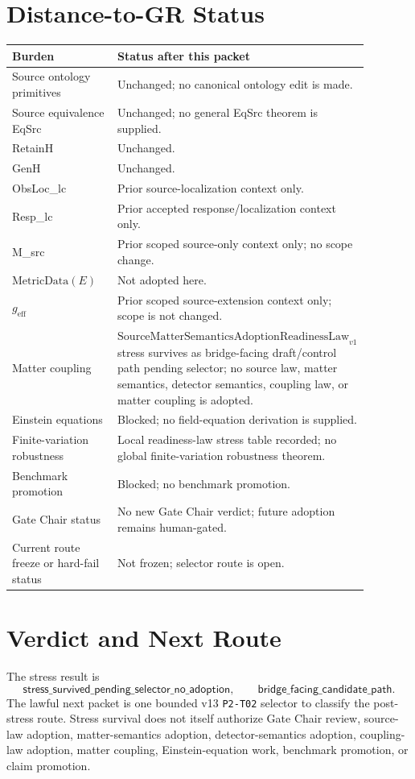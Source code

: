 \documentclass[11pt]{article}
\newcommand{\SMSAR}{\mathrm{SourceMatterSemanticsAdoptionReadinessLaw}_{v1}}
\newcommand{\MetricData}{\mathrm{MetricData}}
\newcommand{\geff}{g_{\mathrm{eff}}}
\newcommand{\StressVerdict}{\mathsf{stress\_survived\_pending\_selector\_no\_adoption}}
\begin{document}
\section{Distance-to-GR Status}

\begin{longtable}{p{0.30\linewidth}p{0.58\linewidth}}
\toprule
Burden & Status after this packet \\
\midrule
Source ontology primitives & Unchanged; no canonical ontology edit is made. \\
Source equivalence EqSrc & Unchanged; no general EqSrc theorem is supplied. \\
RetainH & Unchanged. \\
GenH & Unchanged. \\
ObsLoc\_lc & Prior source-localization context only. \\
Resp\_lc & Prior accepted response/localization context only. \\
M\_src & Prior scoped source-only context only; no scope change. \\
\(\MetricData(E)\) & Not adopted here. \\
\(\geff\) & Prior scoped source-extension context only; scope is not changed. \\
Matter coupling & \(\SMSAR\) stress survives as bridge-facing draft/control
path pending selector; no source law, matter semantics, detector semantics,
coupling law, or matter coupling is adopted. \\
Einstein equations & Blocked; no field-equation derivation is supplied. \\
Finite-variation robustness & Local readiness-law stress table recorded; no
global finite-variation robustness theorem. \\
Benchmark promotion & Blocked; no benchmark promotion. \\
Gate Chair status & No new Gate Chair verdict; future adoption remains
human-gated. \\
Current route freeze or hard-fail status & Not frozen; selector route is open. \\
\bottomrule
\end{longtable}

\section{Verdict and Next Route}

The stress result is
\[
  \StressVerdict,
  \qquad
  \mathsf{bridge\_facing\_candidate\_path}.
\]
The lawful next packet is one bounded v13 \texttt{P2-T02} selector to classify
the post-stress route. Stress survival does not itself authorize Gate Chair
review, source-law adoption, matter-semantics adoption, detector-semantics
adoption, coupling-law adoption, matter coupling, Einstein-equation work,
benchmark promotion, or claim promotion.
\end{document}
